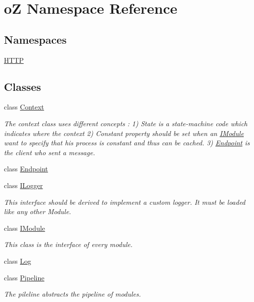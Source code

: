 \hypertarget{namespaceo_z}{}\section{oZ Namespace Reference}
\label{namespaceo_z}
\subsection*{Namespaces}
\begin{DoxyCompactItemize}
\item 
 \mbox{\hyperlink{namespaceo_z_1_1_h_t_t_p}{H\+T\+TP}}
\end{DoxyCompactItemize}
\subsection*{Classes}
\begin{DoxyCompactItemize}
\item 
class \mbox{\hyperlink{classo_z_1_1_context}{Context}}
\begin{DoxyCompactList}\small\item\em The context class uses different concepts \+: 1) State is a state-\/machine code which indicates where the context 2) Constant property should be set when an \mbox{\hyperlink{classo_z_1_1_i_module}{I\+Module}} want to specify that his process is constant and thus can be cached. 3) \mbox{\hyperlink{classo_z_1_1_endpoint}{Endpoint}} is the client who sent a message. \end{DoxyCompactList}\item 
class \mbox{\hyperlink{classo_z_1_1_endpoint}{Endpoint}}
\item 
class \mbox{\hyperlink{classo_z_1_1_i_logger}{I\+Logger}}
\begin{DoxyCompactList}\small\item\em This interface should be derived to implement a custom logger. It must be loaded like any other Module. \end{DoxyCompactList}\item 
class \mbox{\hyperlink{classo_z_1_1_i_module}{I\+Module}}
\begin{DoxyCompactList}\small\item\em This class is the interface of every module. \end{DoxyCompactList}\item 
class \mbox{\hyperlink{classo_z_1_1_log}{Log}}
\item 
class \mbox{\hyperlink{classo_z_1_1_pipeline}{Pipeline}}
\begin{DoxyCompactList}\small\item\em The pileline abstracts the pipeline of modules. \end{DoxyCompactList}\end{DoxyCompactItemize}
